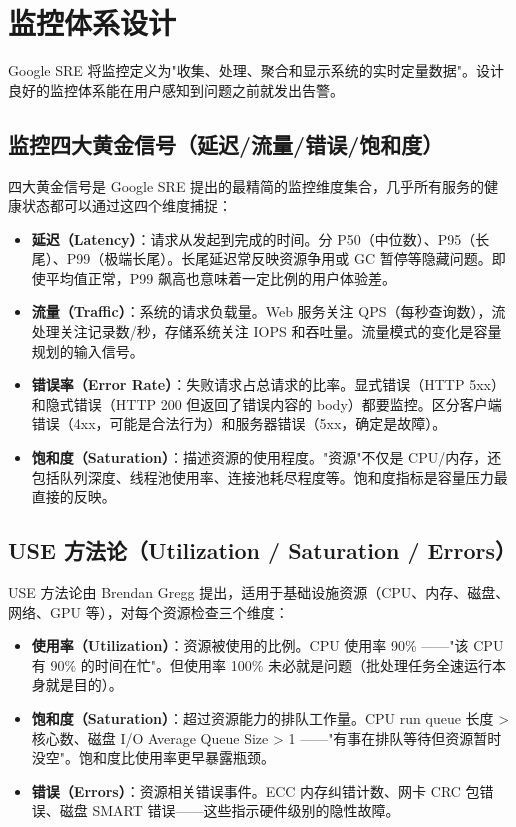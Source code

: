 \documentclass[12pt,UTF8]{ctexbook}
\begin{document}
\chapter{监控体系设计}
\label{chap:monitoring-design}

Google SRE 将监控定义为"收集、处理、聚合和显示系统的实时定量数据"。设计良好的监控体系能在用户感知到问题之前就发出告警。

  \section{监控四大黄金信号（延迟/流量/错误/饱和度）}

四大黄金信号是 Google SRE 提出的最精简的监控维度集合，几乎所有服务的健康状态都可以通过这四个维度捕捉：

\begin{itemize}
	\item \textbf{延迟（Latency）}：请求从发起到完成的时间。分 P50（中位数）、P95（长尾）、P99（极端长尾）。长尾延迟常反映资源争用或 GC 暂停等隐藏问题。即使平均值正常，P99 飙高也意味着一定比例的用户体验差。
	\item \textbf{流量（Traffic）}：系统的请求负载量。Web 服务关注 QPS（每秒查询数），流处理关注记录数/秒，存储系统关注 IOPS 和吞吐量。流量模式的变化是容量规划的输入信号。
	\item \textbf{错误率（Error Rate）}：失败请求占总请求的比率。显式错误（HTTP 5xx）和隐式错误（HTTP 200 但返回了错误内容的 body）都要监控。区分客户端错误（4xx，可能是合法行为）和服务器错误（5xx，确定是故障）。
	\item \textbf{饱和度（Saturation）}：描述资源的使用程度。"资源"不仅是 CPU/内存，还包括队列深度、线程池使用率、连接池耗尽程度等。饱和度指标是容量压力最直接的反映。
\end{itemize}

  \section{USE 方法论（Utilization / Saturation / Errors）}

USE 方法论由 Brendan Gregg 提出，适用于基础设施资源（CPU、内存、磁盘、网络、GPU 等），对每个资源检查三个维度：

\begin{itemize}
	\item \textbf{使用率（Utilization）}：资源被使用的比例。CPU 使用率 90\% ——"该 CPU 有 90\% 的时间在忙"。但使用率 100\% 未必就是问题（批处理任务全速运行本身就是目的）。
	\item \textbf{饱和度（Saturation）}：超过资源能力的排队工作量。CPU run queue 长度 > 核心数、磁盘 I/O Average Queue Size > 1 ——"有事在排队等待但资源暂时没空"。饱和度比使用率更早暴露瓶颈。
	\item \textbf{错误（Errors）}：资源相关错误事件。ECC 内存纠错计数、网卡 CRC 包错误、磁盘 SMART 错误——这些指示硬件级别的隐性故障。
\end{itemize}
\end{document}
